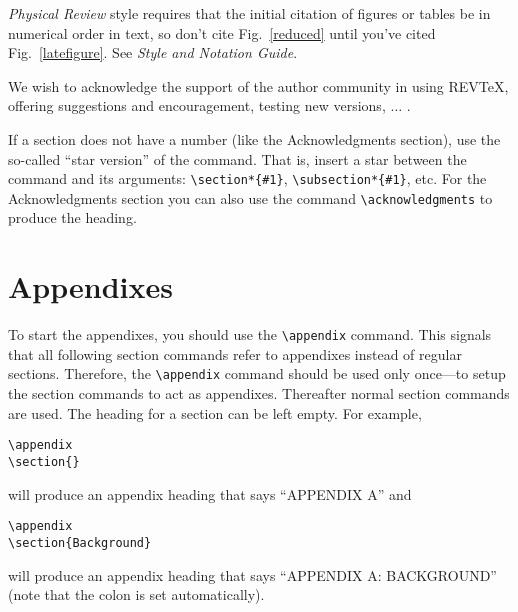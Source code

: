 {\it Physical Review}
style requires that the initial citation of figures or tables
be in numerical order in text, so don't cite Fig.~\ref{reduced}
until you've cited Fig.~\ref{latefigure}.
See {\it Style and Notation
Guide}.




\acknowledgments

We wish to acknowledge the support of the author community in using
REV\TeX{}, offering suggestions and encouragement, testing new versions,
$\ldots$ .

If a section does not have a number (like the Acknowledgments
section), use the so-called ``star version'' of the command. That is,
insert a star between the command and its arguments:
\verb+\section*{#1}+, \verb+\subsection*{#1}+, etc.
For the Acknowledgments section you can also use the command
\verb+\acknowledgments+ to produce the heading.

\appendix
\section{Appendixes}

To start the appendixes, you should use the \verb+\appendix+ command.
This signals that all following section commands refer to appendixes instead
of regular sections.
Therefore, the \verb+\appendix+ command should be used only once---to setup
the section commands to act as appendixes. Thereafter normal section commands
are used.
The heading for a section can be left empty. For example,
\begin{verbatim}
\appendix
\section{}
\end{verbatim}
will produce an appendix heading that says ``APPENDIX A'' and
\begin{verbatim}
\appendix
\section{Background}
\end{verbatim}
will produce an appendix heading that says ``APPENDIX A: BACKGROUND'' (note
that the colon is set automatically).

